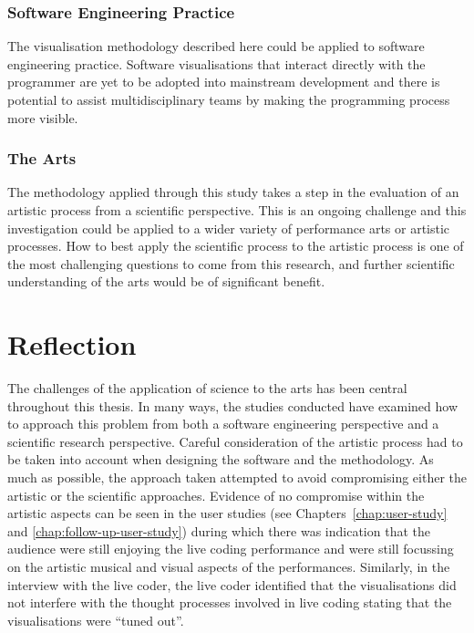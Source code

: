 \subsubsection{Software Engineering Practice}

The visualisation methodology described here could be applied to software engineering practice. Software visualisations that interact directly with the programmer are yet to be adopted into mainstream development and there is potential to assist multidisciplinary teams by making the programming process more visible.

\subsubsection{The Arts}

The methodology applied through this study takes a step in the evaluation of an artistic process from a scientific perspective. This is an ongoing challenge and this investigation could be applied to a wider variety of performance arts or artistic processes. How to best apply the scientific process to the artistic process is one of the most challenging questions to come from this research, and further scientific understanding of the arts would be of significant benefit.

\section{Reflection}

The challenges of the application of science to the arts has been central throughout this thesis. In many ways, the studies conducted have examined how to approach this problem from both a software engineering perspective and a scientific research perspective. Careful consideration of the artistic process had to be taken into account when designing the software and the methodology. As much as possible, the approach taken attempted to avoid compromising either the artistic or the scientific approaches. Evidence of no compromise within the artistic aspects can be seen in the user studies (see Chapters~\ref{chap:user-study} and \ref{chap:follow-up-user-study}) during which there  was indication that the audience were still enjoying the live coding performance and were still focussing on the artistic musical and visual aspects of the performances. Similarly, in the interview with the live coder, the live coder identified that the visualisations did not interfere with the thought processes involved in live coding stating that the visualisations were ``tuned out''.

